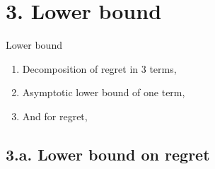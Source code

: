 \documentclass[12pt,english,ignorenonframetext,aspectratio=169,]{beamer}
\providecommand{\tightlist}{%
  \setlength{\itemsep}{0pt}\setlength{\parskip}{0pt}}
\begin{document}
\section{\hfill{}3. Lower bound\hfill{}}

\begin{frame}{Lower bound}

\begin{enumerate}
\def\labelenumi{\arabic{enumi}.}
\tightlist
\item
  Decomposition of regret in \(3\) terms,\vspace*{15pt}
\item
  Asymptotic lower bound of one term,\vspace*{15pt}
\item
  And for regret,
\end{enumerate}

\end{frame}



\subsection{\hfill{}3.a. Lower bound on regret\hfill{}}
\end{document}
